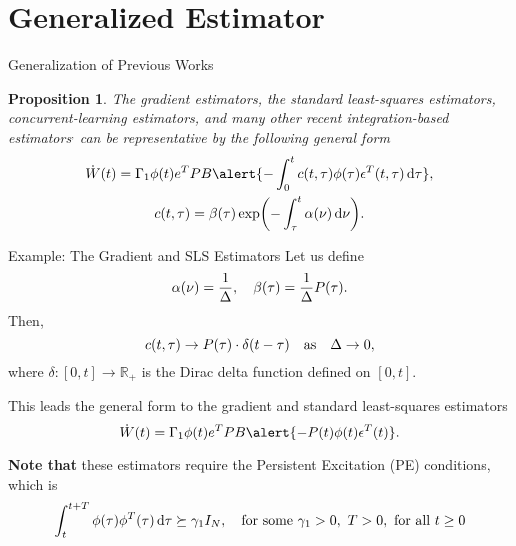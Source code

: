 \documentclass[handout]{beamer}
\theoremstyle{plain}
\newtheorem{proposition}{Proposition}
\theoremstyle{definition}
\theoremstyle{remark}
\newcommand{\MB}[1]{\mathbb{#1}}
\begin{document}
\section{Generalized Estimator}

\begin{frame}{Generalization of Previous Works}
	\begin{proposition}
		The gradient estimators, the standard least-squares
		estimators, concurrent-learning
		estimators, and many other recent
		integration-based estimators$^,$
		 can be representative by the following
		general form
		\begin{gather*}
			\dot{W}(t) = \Gamma_1 \phi(t) e^T P B \alert{- \int_0^t c(t, \tau)
			\phi(\tau) \epsilon^T(t, \tau) \dd{\tau}}, \\
			c(t,\tau) = \beta(\tau) \exp(- \int_\tau^t \alpha(\nu) \dd{\nu}).
		\end{gather*}
	\end{proposition}
\end{frame}

\begin{frame}{Example: The Gradient and SLS Estimators}
	Let us define
	\begin{equation*}
		\alpha(\nu) = \frac{1}{\Delta} \qc \beta(\tau) = \frac{1}{\Delta}
		P(\tau).
	\end{equation*}
	\pause
	Then,
	\begin{equation*}
		c(t, \tau) \to P(\tau) \cdot \delta(t-\tau) \qas \Delta \to 0,
	\end{equation*}
	where $\delta: [0, t] \to \MB{R}_{+}$ is the Dirac delta function defined on
	$[0, t]$.
	\pause

	This leads the general form to the gradient and standard least-squares
	estimators
	\begin{equation*}
		\dot{W}(t) = \Gamma_1 \phi(t) e^T P B \alert{- P(t) \phi(t) \epsilon^T(t)}.
	\end{equation*}

	\textbf{Note that} these estimators require the \alert{Persistent Excitation
	(PE)} conditions, which is
	\begin{equation*}
		\int_t^{t + T} \phi(\tau) \phi^T(\tau) \dd{\tau} \succeq \gamma_1 I_N \qc
		\text{for some } \gamma_1 > 0,\ T > 0,\ \text{for all } t \ge 0
	\end{equation*}
\end{frame}
\end{document}
